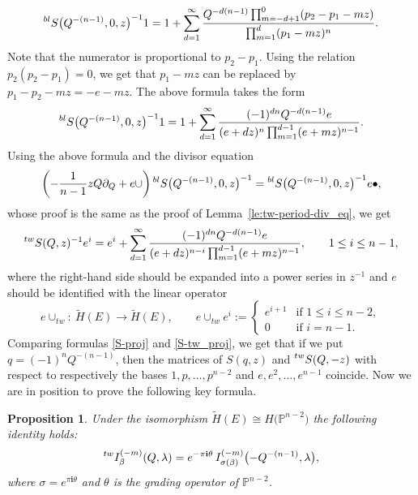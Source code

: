 \documentclass[10pt,a4paper]{article}
\numberwithin{equation}{section}
\newtheorem{Proposition}[Theorem]{Proposition}
\newcommand{\leftexp}[2]{{\vphantom{#2}}^{#1}{#2}}
\newcommand{\PP}{\mathbb{P}}
\newcommand{\ii}{\mathbf{i}}
\begin{document}
\begin{equation}\label{blS}
\leftexp{bl}{S}\big(Q^{-(n-1)},0,z\big)^{-1} 1 = 1+
\sum_{d=1}^\infty
\frac{Q^{-d(n-1)} \prod_{m=-d+1}^0 (p_2-p_1 -mz) }{
\prod_{m=1}^{d} (p_1-mz)^n }.
\end{equation}
Note that the numerator is proportional to $p_2-p_1$. Using the
relation $p_2(p_2-p_1)=0$, we get that $p_1-mz$ can be replaced by
$p_1-p_2-mz= -e-mz$. The above formula takes the form
\begin{equation}\label{blS2}
\leftexp{bl}{S}\big(Q^{-(n-1)},0,z\big)^{-1} 1 = 1+
\sum_{d=1}^\infty
\frac{(-1)^{dn} Q^{-d(n-1)} e }{
(e+dz)^n\prod_{m=1}^{d-1} (e+mz)^{n-1} }.
\end{equation}
Using the above formula and the divisor equation
\[
\left( -\frac{1}{n-1} zQ\partial_Q+ e\cup\right)
\leftexp{bl}{S}\big(Q^{-(n-1)},0,z\big)^{-1} =
\leftexp{bl}{S}\big(Q^{-(n-1)},0,z\big)^{-1} e\bullet,
\]
whose proof is the same as the proof of Lemma~\ref{le:tw-period-div_eq}, we get
\begin{equation}\label{S-tw_proj}
\leftexp{tw}{S}(Q,z)^{-1} e^i =
e^i +
\sum_{d=1}^\infty
\frac{(-1)^{dn} Q^{-d(n-1)} e }{
(e+dz)^{n-i}\prod_{m=1}^{d-1} (e+mz)^{n-1} },\qquad 1\leq i\leq n-1,
\end{equation}
where the right-hand side should be expanded into a power series in $z^{-1}$ and
$e$ should be identified with the linear operator
\[
e\cup_{tw}\colon\ \widetilde{H}(E)\to \widetilde{H}(E),\qquad
e\cup_{tw} e^i :=
\begin{cases}
e^{i+1} & \mbox{if } 1\leq i\leq n-2,\\
0 & \mbox{if } i=n-1.
\end{cases}
\]
Comparing formulas \eqref{S-proj} and \eqref{S-tw_proj}, we get that
if we put $q=(-1)^n Q^{-(n-1)}$, then the matrices of $S(q,z)$ and
$\leftexp{tw}{S}(Q,-z)$ with respect to respectively the bases
$1,p,\dots,p^{n-2}$ and $e,e^2,\dots,e^{n-1}$ coincide. Now we are in
position to prove the following key formula.
\begin{Proposition}\label{prop:tw=proj}
Under the isomorphism
$\widetilde{H}(E)\cong H\big(\PP^{n-2}\big)$ the following identity holds:
\[%
\leftexp{tw}{I}^{(-m)}_\beta(Q,\lambda) =
e^{-\pi\ii\theta}\,
I^{(-m)}_{\sigma(\beta)}\bigl(-Q^{-(n-1)},\lambda\bigr),
\]
where $\sigma=e^{\pi\ii\theta}$ and $\theta$ is the grading operator
of $\PP^{n-2}$.
\end{Proposition}
\end{document}
